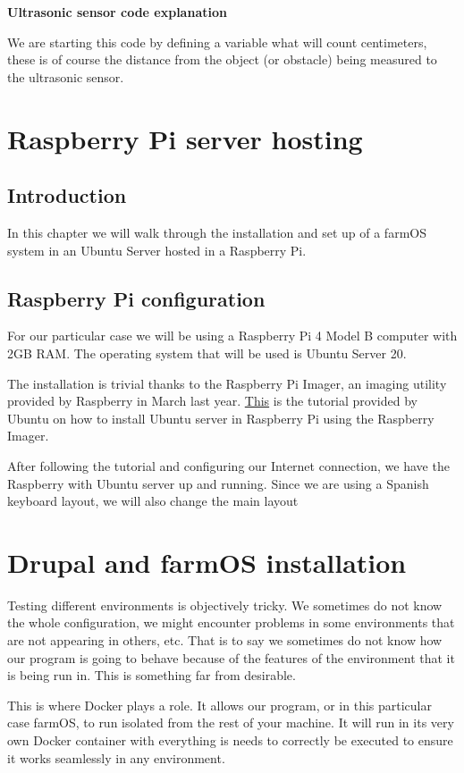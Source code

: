 \textbf{Ultrasonic sensor code explanation}

We are starting this code by defining a variable what will count centimeters, these is of course the distance from the object (or obstacle) being measured to the ultrasonic sensor.



\section{Raspberry Pi server hosting}

\subsection{Introduction}
In this chapter we will walk through the installation and set up of a farmOS system in an Ubuntu Server hosted in a Raspberry Pi.

\subsection{Raspberry Pi configuration}
For our particular case we will be using a Raspberry Pi 4 Model B computer with 2GB RAM. The operating system that will be used is Ubuntu Server 20.

The installation is trivial thanks to the Raspberry Pi Imager, an imaging utility provided by Raspberry in March last year. \href{https://ubuntu.com/tutorials/how-to-install-ubuntu-on-your-raspberry-pi#1-overview}{This} is the tutorial provided by Ubuntu on how to install Ubuntu server in Raspberry Pi using the Raspberry Imager.

After following the tutorial and configuring our Internet connection, we have the Raspberry with Ubuntu server up and running. Since we are using a Spanish keyboard layout, we will also change the main layout
\section{Drupal and farmOS installation}

Testing different environments is objectively tricky. We sometimes do not know the whole configuration, we might encounter problems in some environments that are not appearing in others, etc. That is to say we sometimes do not know how our program is going to behave because of the features of the environment that it is being run in. This is something far from desirable.

This is where Docker plays a role. It allows our program, or in this particular case farmOS, to run isolated from the rest of your machine. It will run in its very own Docker container with everything is needs to correctly be executed to ensure it works seamlessly in any environment. 

